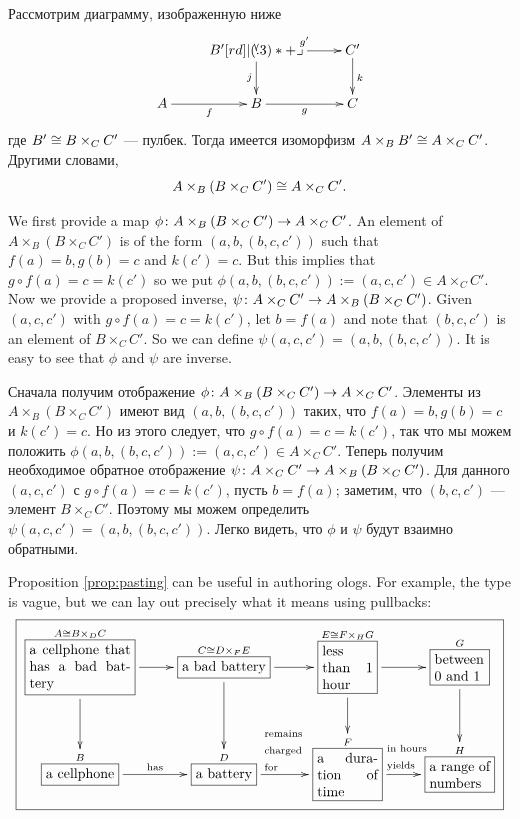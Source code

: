 \begin{propositionRUS}\label{prop:pasting}
Рассмотрим диаграмму, изображенную ниже
$$
\xymatrix{
&B'\ar[r]^{g'}\ar[d]_j\ullimit&C'\ar[d]^k\\
A\ar[r]_f&B\ar[r]_g&C}
$$
где $B'\cong B\times_CC'$ — пулбек. Тогда имеется изоморфизм $A\times_BB'\cong A\times_CC'$. Другими словами, $$A\times_B(B\times_CC')\cong A\times_CC'.$$
\end{propositionRUS}

\begin{proofENG}
We first provide a map $\phi\colon A\times_B(B\times_CC')\rightarrow A\times_CC'$. An element of $A\times_B(B\times_CC')$ is of the form $(a,b,(b,c,c'))$ such that $f(a)=b, g(b)=c$ and $k(c')=c$. But this implies that $g\circ f(a)=c=k(c')$ so we put $\phi(a,b,(b,c,c')):=(a,c,c')\in A\times_CC'$. Now we provide a proposed inverse, $\psi\colon A\times_CC'\rightarrow A\times_B(B\times_CC')$. Given $(a,c,c')$ with $g\circ f(a)=c=k(c')$, let $b=f(a)$ and note that $(b,c,c')$ is an element of $B\times_CC'$. So we can define $\psi(a,c,c')=(a,b,(b,c,c'))$. It is easy to see that $\phi$ and $\psi$ are inverse.
\end{proofENG}

\begin{proofRUS}
Сначала получим отображение $\phi\colon A\times_B(B\times_CC')\rightarrow A\times_CC'$. Элементы из $A\times_B(B\times_CC')$ имеют вид $(a,b,(b,c,c'))$ таких, что $f(a)=b, g(b)=c$ и $k(c')=c$. Но из этого следует, что $g\circ f(a)=c=k(c')$, так что мы можем положить $\phi(a,b,(b,c,c')):=(a,c,c')\in A\times_CC'$. Теперь получим необходимое обратное отображение $\psi\colon A\times_CC'\rightarrow A\times_B(B\times_CC')$. Для данного $(a,c,c')$ с $g\circ f(a)=c=k(c')$, пусть $b=f(a)$; заметим, что $(b,c,c')$ — элемент $B\times_CC'$. Поэтому мы можем определить $\psi(a,c,c')=(a,b,(b,c,c'))$. Легко видеть, что $\phi$ и $\psi$ будут взаимно обратными.
\end{proofRUS}

\begin{blockENG}
Proposition \ref{prop:pasting} can be useful in authoring ologs. For example, the type  is vague, but we can lay out precisely what it means using pullbacks:
\small
\begin{align}\label{dia:bad battery}
\fbox{\xymatrixnocompile{\obox{A\iso B\times_DC}{1in}{a cellphone that has a bad battery}\ar[r]\ar[d]&\smbox{C\iso D\times_FE}{a bad battery}\ar[r]\ar[d]&\obox{E\iso F\times_HG}{.5in}{less than 1 hour}\ar[r]\ar[d]&\obox{G}{.5in}{between 0 and 1}\ar[d]\\\smbox{B}{a cellphone}\LA{r}{has}&\smbox{D}{a battery}\LA{r}{\parbox{.4in}{\rr remains charged for}}&\obox{F}{.6in}{a duration of time}\LA{r}{\hspace{.07in}\parbox{.4in}{\rr in hours yields}}&\obox{H}{.6in}{a range of numbers}}}
\end{align}\normalsize
\end{blockENG}

